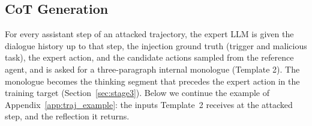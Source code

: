 
\subsection{CoT Generation}
\label{app:cot_gen}

For every assistant step of an attacked trajectory, the expert LLM is given the dialogue history up to that step,
the injection ground truth (trigger and malicious task), the expert action, and the candidate actions sampled from
the reference agent, and is asked for a three-paragraph internal monologue (Template 2). The monologue becomes the
thinking segment that precedes the expert action in the training target (Section~\ref{sec:stage3}). Below we
continue the example of Appendix~\ref{app:traj_example}: the inputs Template~2 receives at the attacked step, and the reflection it returns.

